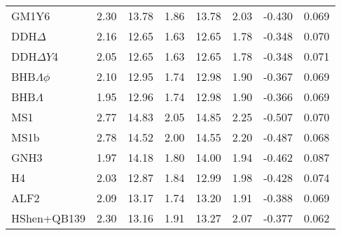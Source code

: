 \documentclass[fleqn,usenatbib]{mnras}
\begin{document}
\begin{table*}
\begin{centering}
\begin{tabular}{lccccccc}
  GM1Y6             & 2.30 & 13.78   & 1.86 & 13.78   & 2.03 & -0.430 &  0.069 \\
  DDH$\Delta$       & 2.16 & 12.65   & 1.63 & 12.65   & 1.78 & -0.348 &  0.070 \\
  DDH$\Delta Y$4    & 2.05 & 12.65   & 1.63 & 12.65   & 1.78 & -0.348 &  0.071 \\
  BHB$\Lambda\phi$  & 2.10 & 12.95   & 1.74 & 12.98   & 1.90 & -0.367 &  0.069 \\
  BHB$\Lambda$      & 1.95 & 12.96   & 1.74 & 12.98   & 1.90 & -0.366 &  0.069 \\
  MS1               & 2.77 & 14.83   & 2.05 & 14.85   & 2.25 & -0.507 &  0.070 \\
  MS1b              & 2.78 & 14.52   & 2.00 & 14.55   & 2.20 & -0.487 &  0.068 \\
  GNH3              & 1.97 & 14.18   & 1.80 & 14.00   & 1.94 & -0.462 &  0.087 \\
  H4                & 2.03 & 12.87   & 1.84 & 12.99   & 1.98 & -0.428 &  0.074 \\
  ALF2              & 2.09 & 13.17   & 1.74 & 13.20   & 1.91 & -0.388 &  0.069 \\
  HShen+QB139       & 2.30 & 13.16   & 1.91 & 13.27   & 2.07 & -0.377 &  0.062 \\
  \hline
\end{tabular}
\end{centering}
\end{table*}
\end{document}
